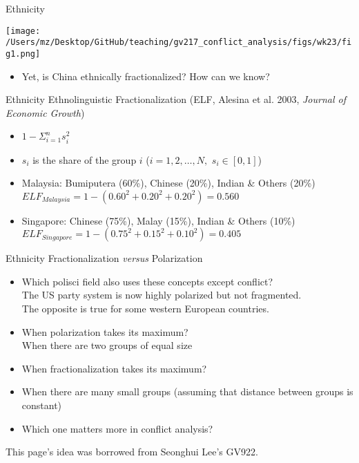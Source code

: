 \documentclass{beamer}
\begin{document}
\begin{frame}{Ethnicity}
    \pause
    \begin{center}
        \texttt{[image: /Users/mz/Desktop/GitHub/teaching/gv217\_conflict\_analysis/figs/wk23/fig1.png]}
    \end{center}
    \begin{itemize}
        \pause\item Yet, is China ethnically fractionalized? How can we know?    
    \end{itemize}
\end{frame}

\begin{frame}{Ethnicity}
    \pause Ethnolinguistic Fractionalization (ELF, Alesina et al. 2003, \textit{Journal of Economic Growth})
    \begin{itemize}
        \pause\item \(1 - \Sigma_{i = 1}^{n} s_{i}^2\)
        \pause\item \(s_{i}\) is the share of the group \(i\) (\(i = 1, 2, \ldots, N, \) \(s_{i} \in [0, 1]\))
        \pause\item Malaysia: Bumiputera (60\%), Chinese (20\%), Indian \& Others (20\%)
        \pause      \(ELF_{Malaysia} = 1 - (0.60^2 + 0.20^2 + 0.20^2) = 0.560\)
        \pause\item Singapore: Chinese (75\%), Malay (15\%), Indian \& Others (10\%)
        \pause      \(ELF_{Singapore} = 1 - (0.75^2 + 0.15^2 + 0.10^2) = 0.405\)
    \end{itemize}
\end{frame}

\begin{frame}{Ethnicity}
    \pause Fractionalization \textit{versus} Polarization
    \begin{itemize}
        \pause\item Which polisci field also uses these concepts except conflict?\\
        \pause      The US party system is now highly polarized but not fragmented.\\
        \pause      The opposite is true for some western European countries.
        \pause\item When polarization takes its maximum?\\
        \pause      When there are two groups of equal size
        \pause\item When fractionalization takes its maximum?\\
        \pause\item When there are many small groups (assuming that distance between groups is constant)
        \pause\item Which one matters more in conflict analysis?
\end{itemize}
\vfill
\tiny This page's idea was borrowed from Seonghui Lee's GV922.
\end{frame}
\end{document}
